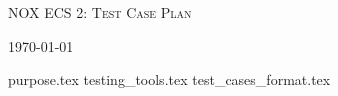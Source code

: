 \documentclass{article}
\begin{document}
\begin{titlepage}
    \centering
    {\scshape\LARGE NOX ECS 2: Test Case Plan \par}
    \vfill
    {\large \today\par}
\end{titlepage}

\tableofcontents
\pagebreak


{purpose.tex}
{testing_tools.tex}
{test_cases_format.tex}
\end{document}
